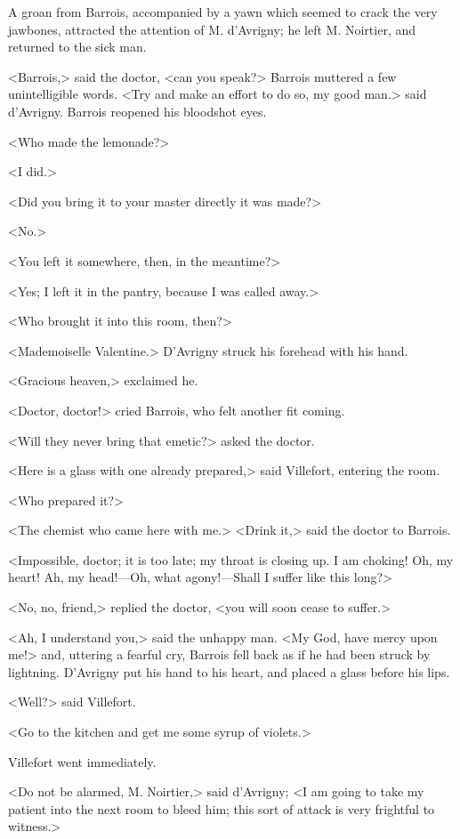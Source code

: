  A groan from Barrois, accompanied by a yawn which seemed to crack the very jawbones, attracted the attention of M. d'Avrigny; he left M. Noirtier, and returned to the sick man. 

 <Barrois,> said the doctor, <can you speak?> Barrois muttered a few unintelligible words. <Try and make an effort to do so, my good man.> said d'Avrigny. Barrois reopened his bloodshot eyes. 

 <Who made the lemonade?> 

 <I did.> 

 <Did you bring it to your master directly it was made?> 

 <No.> 

 <You left it somewhere, then, in the meantime?> 

 <Yes; I left it in the pantry, because I was called away.> 

 <Who brought it into this room, then?> 

 <Mademoiselle Valentine.> D'Avrigny struck his forehead with his hand. 

 <Gracious heaven,> exclaimed he. 

 <Doctor, doctor!> cried Barrois, who felt another fit coming. 

 <Will they never bring that emetic?> asked the doctor. 

 <Here is a glass with one already prepared,> said Villefort, entering the room. 

 <Who prepared it?> 

 <The chemist who came here with me.>  <Drink it,> said the doctor to Barrois. 

 <Impossible, doctor; it is too late; my throat is closing up. I am choking! Oh, my heart! Ah, my head!—Oh, what agony!—Shall I suffer like this long?> 

 <No, no, friend,> replied the doctor, <you will soon cease to suffer.> 

 <Ah, I understand you,> said the unhappy man. <My God, have mercy upon me!> and, uttering a fearful cry, Barrois fell back as if he had been struck by lightning. D'Avrigny put his hand to his heart, and placed a glass before his lips. 

 <Well?> said Villefort. 

 <Go to the kitchen and get me some syrup of violets.> 

 Villefort went immediately. 

 <Do not be alarmed, M. Noirtier,> said d'Avrigny; <I am going to take my patient into the next room to bleed him; this sort of attack is very frightful to witness.> 

